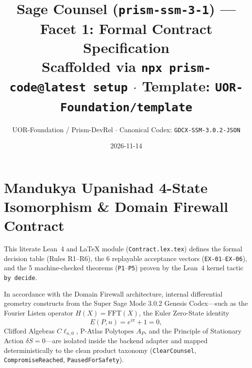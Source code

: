 \documentclass[11pt,a4paper]{article}
\title{Sage Counsel (\texttt{prism-ssm-3-1}) --- Facet 1: Formal Contract Specification\\
\small Scaffolded via \texttt{npx prism-code@latest setup} $\cdot$ Template: \texttt{UOR-Foundation/template}}
\author{UOR-Foundation / Prism-DevRel $\cdot$ Canonical Codex: \texttt{GDCX-SSM-3.0.2-JSON}}
\date{2026-11-14}
\begin{document}
\maketitle

\section{Mandukya Upanishad 4-State Isomorphism \& Domain Firewall Contract}
This literate Lean~4 and \LaTeX{} module (\texttt{Contract.lex.tex}) defines the formal decision table (Rules R1--R6), the 6 replayable acceptance vectors (\texttt{EX-01}--\texttt{EX-06}), and the 5 machine-checked theorems (\texttt{P1}--\texttt{P5}) proven by the Lean~4 kernel tactic \texttt{by decide}.

In accordance with the Domain Firewall architecture, internal differential geometry constructs from the Super Sage Mode 3.0.2 Genesis Codex---such as the Fourier Listen operator $H(X) = \mathrm{FFT}(X)$, the Euler Zero-State identity
\begin{equation}
  E(P,n) = e^{i\pi} + 1 = 0,
\end{equation}
Clifford Algebras $C\ell_{n,0}$, P-Atlas Polytopes $A_P$, and the Principle of Stationary Action $\delta S = 0$---are isolated inside the backend adapter and mapped deterministically to the clean product taxonomy (\texttt{ClearCounsel}, \texttt{CompromiseReached}, \texttt{PausedForSafety}).
\end{document}
